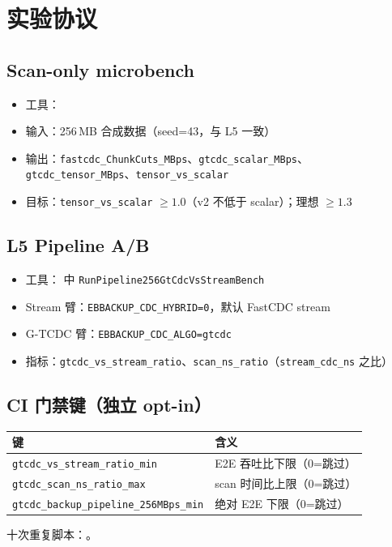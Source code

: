\chapter{实验协议}
\label{ch:experiment}

\section{Scan-only microbench}

\begin{itemize}[nosep]
  \item 工具：
  \item 输入：256\,MB 合成数据（seed=43，与 L5 一致）
  \item 输出：\texttt{fastcdc\_ChunkCuts\_MBps}、\texttt{gtcdc\_scalar\_MBps}、\texttt{gtcdc\_tensor\_MBps}、\texttt{tensor\_vs\_scalar}
  \item 目标：\texttt{tensor\_vs\_scalar} $\ge 1.0$（v2 不低于 scalar）；理想 $\ge 1.3$
\end{itemize}

\section{L5 Pipeline A/B}

\begin{itemize}[nosep]
  \item 工具： 中 \texttt{RunPipeline256GtCdcVsStreamBench}
  \item Stream 臂：\texttt{EBBACKUP\_CDC\_HYBRID=0}，默认 FastCDC stream
  \item G-TCDC 臂：\texttt{EBBACKUP\_CDC\_ALGO=gtcdc}
  \item 指标：\texttt{gtcdc\_vs\_stream\_ratio}、\texttt{scan\_ns\_ratio}（\texttt{stream\_cdc\_ns} 之比）
\end{itemize}

\section{CI 门禁键（独立 opt-in）}

\begin{table}[htbp]
\centering
\begin{tabular}{@{}ll@{}}
\toprule
键 & 含义 \\
\midrule
\texttt{gtcdc\_vs\_stream\_ratio\_min} & E2E 吞吐比下限（0=跳过） \\
\texttt{gtcdc\_scan\_ns\_ratio\_max} & scan 时间比上限（0=跳过） \\
\texttt{gtcdc\_backup\_pipeline\_256MBps\_min} & 绝对 E2E 下限（0=跳过） \\
\bottomrule
\end{tabular}
\end{table}

十次重复脚本：。
